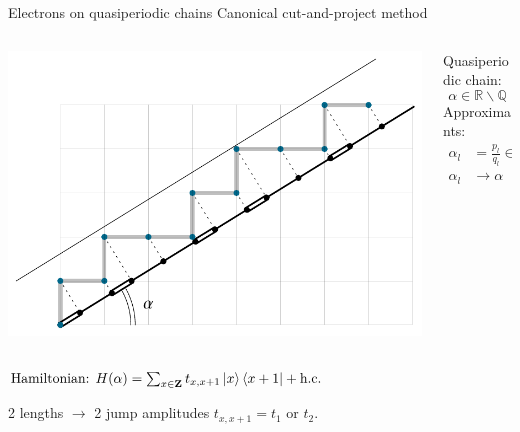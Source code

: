 \documentclass[xcolor=x11names,compress,professionalfonts]{beamer}
\renewcommand{\(}{\begin{columns}}
\renewcommand{\)}{\end{columns}}
\newcommand{\<}[1]{\begin{column}{#1}}
\renewcommand{\>}{\end{column}}
\begin{document}
\begin{frame}{Electrons on quasiperiodic chains}
Canonical cut-and-project method
\begin{columns}
\begin{column}{8.5cm}
	\centering
	\includegraphics[scale=.7]{img/cut_and_project.pdf}
\end{column}

\begin{column}{3cm}
Quasiperiodic chain:
\[
	\alpha \in \mathbb{R} \smallsetminus \mathbb{Q}
\]
Approximants:
\begin{align*}
\alpha_l &= \frac{p_l}{q_l} \in \mathbb{Q} \\
\alpha_l &\rightarrow \alpha
\end{align*}
\end{column}
\end{columns}

	$
		\text{Hamiltonian: } H(\alpha) = \sum_{x \in \mathbf{Z}} t_{x,x+1} \ket{x} \bra{x+1} + \text{h.c.}
	$
	
	2 lengths $\to$ 2 jump amplitudes $t_{x,x+1} = t_{1}$ or $t_2$.	
\end{frame}
\end{document}

